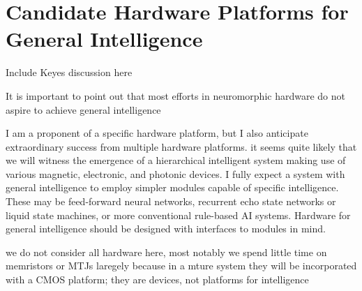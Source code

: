 \section{\label{sec:hardware}Candidate Hardware Platforms for General Intelligence}
Include Keyes discussion here

\vspace{3em}
It is important to point out that most efforts in neuromorphic hardware do not aspire to achieve general intelligence

\vspace{3em}
I am a proponent of a specific hardware platform, but I also anticipate extraordinary success from multiple hardware platforms. it seems quite likely that we will witness the emergence of a hierarchical intelligent system making use of various magnetic, electronic, and photonic devices. I fully expect a system with general intelligence to employ simpler modules capable of specific intelligence. These may be feed-forward neural networks, recurrent echo state networks or liquid state machines, or more conventional rule-based AI systems. Hardware for general intelligence should be designed with interfaces to modules in mind.

\vspace{3em}
we do not consider all hardware here, most notably we spend little time on memristors or MTJs laregely because in a mture system they will be incorporated with a CMOS platform; they are devices, not platforms for intelligence

\vspace{3em}








